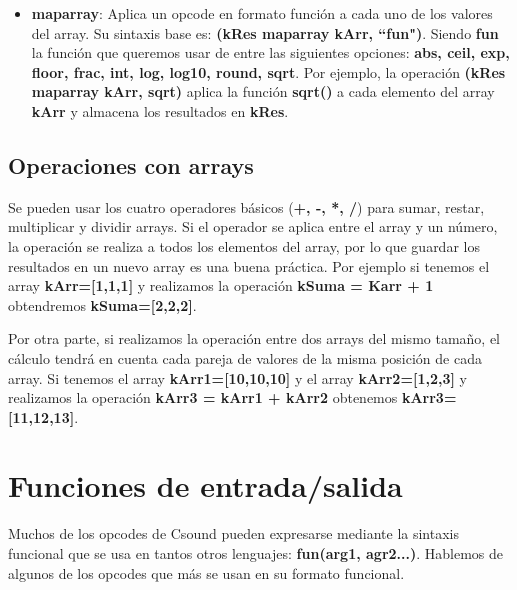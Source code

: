 \begin{itemize}
 \item \textbf{maparray}: Aplica un opcode en formato función a cada uno de los valores del array. Su sintaxis base es: \textbf{(kRes  maparray kArr, ``fun")}. Siendo \textbf{fun} la función que queremos usar de entre las siguientes opciones: \textbf{abs, ceil, exp, floor, frac, int, log, log10, round, sqrt}. Por ejemplo, la operación \textbf{(kRes  maparray kArr, sqrt)} aplica la función \textbf{sqrt()} a cada elemento del array \textbf{kArr} y almacena los resultados en \textbf{kRes}.
  
\end{itemize}

\subsection{Operaciones con arrays}

Se pueden usar los cuatro operadores básicos (\textbf{+, -, *, /}) para sumar, restar, multiplicar y dividir arrays. Si el operador se aplica entre el array y un número, la operación se realiza a todos los elementos del array, por lo que guardar los resultados en un nuevo array es una buena práctica. Por ejemplo si tenemos el array \textbf{kArr=[1,1,1]} y realizamos la operación \textbf{kSuma = Karr + 1} obtendremos \textbf{kSuma=[2,2,2]}.

Por otra parte, si realizamos la operación entre dos arrays del mismo tamaño, el cálculo tendrá en cuenta cada pareja de valores de la misma posición de cada array. Si tenemos el array \textbf{kArr1=[10,10,10]} y el array \textbf{kArr2=[1,2,3]} y realizamos la operación \textbf{kArr3 = kArr1 + kArr2} obtenemos \textbf{kArr3=[11,12,13]}.

\section{Funciones de entrada/salida}

Muchos de los opcodes de Csound pueden expresarse mediante la sintaxis funcional que se usa en tantos otros lenguajes: \textbf{fun(arg1, agr2...)}. Hablemos de algunos de los opcodes que más se usan en su formato funcional.

